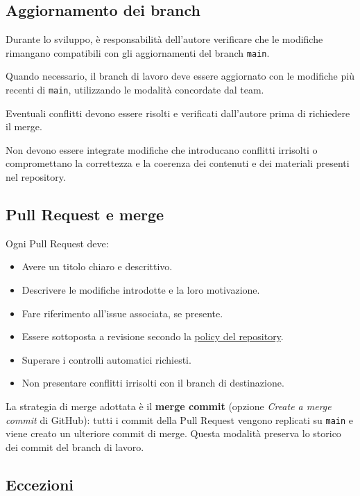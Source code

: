 \documentclass[11pt, a4paper]{article}
\begin{document}
\subsection{Aggiornamento dei branch}

Durante lo sviluppo, è responsabilità dell'autore verificare che le modifiche rimangano compatibili con gli aggiornamenti del branch \texttt{main}.

Quando necessario, il branch di lavoro deve essere aggiornato con le modifiche più recenti di \texttt{main}, utilizzando le modalità concordate dal team.

Eventuali conflitti devono essere risolti e verificati dall'autore prima di richiedere il merge.

Non devono essere integrate modifiche che introducano conflitti irrisolti o compromettano la correttezza e la coerenza dei contenuti e dei materiali presenti nel repository.

\subsection{Pull Request e merge}
\label{subsec:pull-request-e-merge}

Ogni Pull Request deve:
\begin{itemize}
    \item Avere un titolo chiaro e descrittivo.
    \item Descrivere le modifiche introdotte e la loro motivazione.
    \item Fare riferimento all'issue associata, se presente.
    \item Essere sottoposta a revisione secondo la \hyperref[subsec:regole-generali]{policy del repository}.
    \item Superare i controlli automatici richiesti.
    \item Non presentare conflitti irrisolti con il branch di destinazione.
\end{itemize}

\noindent La strategia di merge adottata è il \textbf{merge commit} (opzione \textit{Create a merge commit} di GitHub): tutti i commit della Pull Request vengono replicati su \texttt{main} e viene creato un ulteriore commit di merge. Questa modalità preserva lo storico dei commit del branch di lavoro.

\subsection{Eccezioni}
\end{document}
